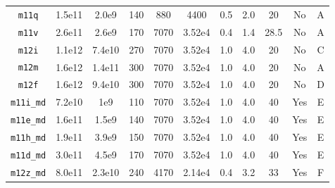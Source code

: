 \documentclass[fleqn,usenatbib]{mnras}
\begin{document}
\begin{table}
\begin{tabular}{ccccccccccc}
\texttt{m11q}    & 1.5e11               & 2.0e9                   &  140                        &  880           &  4400         & 0.5          & 2.0           &      20      &                No                     &    A              \\ 
\texttt{m11v}    & 2.6e11               & 2.6e9                   &  170                        &  7070           &  3.52e4         & 0.4          & 1.4           &      28.5      &                No                     &    A            \\ 
\texttt{m12i}    & 1.1e12                & 7.4e10                   &  270                        &  7070           &  3.52e4         & 1.0         & 4.0           &      20       &                No                     &    C              \\ 
\texttt{m12m}    & 1.6e12             & 1.4e11                   &  300                        &  7070           &  3.52e4         & 1.0         & 4.0           &      20       &                No                     &   A               \\ 
\texttt{m12f}    & 1.6e12               & 9.4e10                   &  300                        &  7070           &  3.52e4         & 1.0         & 4.0           &      20       &                No                     &   D            \\
\texttt{m11i\_md}    & 7.2e10               & 1e9                   &  110                        &  7070           &  3.52e4         & 1.0         & 4.0           &      40       &                Yes                     &    E              \\ 
\texttt{m11e\_md}    & 1.6e11               & 1.5e9                  &  140                        &  7070           &  3.52e4         & 1.0         & 4.0           &      40       &                Yes                     &    E              \\ 
\texttt{m11h\_md}    & 1.9e11               & 3.9e9                   &  150                        &  7070           &  3.52e4         & 1.0         & 4.0           &      40       &                Yes                     &    E              \\ 
\texttt{m11d\_md}    & 3.0e11               & 4.5e9                   &  170                        &  7070           &  3.52e4         & 1.0         & 4.0           &      40       &                Yes                     &    E              \\ 
\texttt{m12z\_md}    & 8.0e11                 & 2.3e10                  &  240                        &  4170           &  2.14e4         & 0.4         & 3.2           &      33       &                Yes                     &    F              \\ 

\end{tabular}
\end{table}
\end{document}
